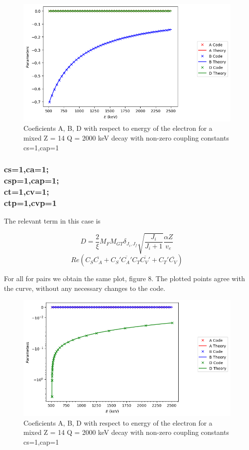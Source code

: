 \documentclass[twocolumn]{article}
\begin{document}
  \begin{figure}
 	\centering
 	\includegraphics[width=\columnwidth]{plots/cscap_real_mixed_result.png}
 	\caption{Coeficients A, B, D with respect to energy of the electron for a mixed Z = 14 Q = 2000 keV decay with non-zero coupling constants cs=1,cap=1}
 \end{figure}
 
 
\subsubsection*{cs=1,ca=1;\\csp=1,cap=1;\\ct=1,cv=1;\\ctp=1,cvp=1}

The relevant term in this case is 

$$D = \frac{2}{\xi}M_FM_{GT}\delta_{J_i,J_f}\sqrt{\frac{J_i}{J_i+1}}\frac{\alpha Z }{v_e}$$$$Re(C_S\overline{C_A}+C_S'\overline{C_A'}C_T\overline{C_V'}+C_T'\overline{C_V})$$

For all for pairs we obtain the same plot, figure 8. The plotted points agree with the curve, without any necessary changes to the code.

\begin{figure}
	\centering
	\includegraphics[width=\columnwidth]{plots/csca_real_mixed_result.png}
	\caption{Coeficients A, B, D with respect to energy of the electron for a mixed Z = 14 Q = 2000 keV decay with non-zero coupling constants cs=1,cap=1}
\end{figure}
\end{document}
